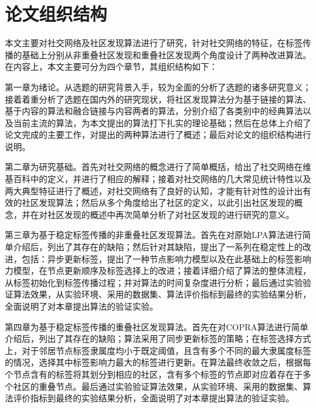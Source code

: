 \section{论文组织结构}

本文主要对社交网络及社区发现算法进行了研究，针对社交网络的特征，在标签传播的基础上分别从非重叠社区发现和重叠社区发现两个角度设计了两种改进算法。在内容上，本文主要可分为四个章节，其组织结构如下：

第一章为绪论。从选题的研究背景入手，较为全面的分析了选题的诸多研究意义；接着着重分析了选题在国内外的研究现状，将社区发现算法分为基于链接的算法、基于内容的算法和融合链接与内容两者的算法，分别介绍了各类别中的经典算法以及当前主流的算法，为本文提出的算法打下扎实的理论基础；然后在总体上介绍了论文完成的主要工作，对提出的两种算法进行了概述；最后对论文的组织结构进行说明。

第二章为研究基础。首先对社交网络的概念进行了简单概括，给出了社交网络在维基百科中的定义，并进行了相应的解释；接着对社交网络的几大常见统计特性以及两大典型特征进行了概述，对社交网络有了良好的认知，才能有针对性的设计出有效的社区发现算法；然后从多个角度给出了社区的定义，以此引出社区发现的概念，并在对社区发现的概述中再次简单分析了对社区发现的进行研究的意义。

第三章为基于稳定标签传播的非重叠社区发现算法。首先在对原始LPA算法进行简单介绍后，列出了其存在的缺陷；然后针对其缺陷，提出了一系列在稳定性上的改进，包括：异步更新标签，提出了一种节点影响力模型以及在此基础上的标签影响力模型，在节点更新顺序及标签选择上的改进；接着详细介绍了算法的整体流程，从标签初始化到标签传播过程；并对算法的时间复杂度进行分析；最后通过实验验证算法效果，从实验环境、采用的数据集、算法评价指标到最终的实验结果分析，全面说明了对本章提出算法的验证实验。

第四章为基于稳定标签传播的重叠社区发现算法。首先在对COPRA算法进行简单介绍后，列出了其存在的缺陷；算法采用了同步更新标签的策略；在标签选择方式上，对于邻居节点标签隶属度均小于既定阈值，且含有多个不同的最大隶属度标签的情况，选择其中标签影响力最大的标签进行更新。在算法最终收敛之后，根据每个节点含有的标签将其划分到相应的社区，含有多个标签的节点即对应着存在于多个社区的重叠节点。最后通过实验验证算法效果，从实验环境、采用的数据集、算法评价指标到最终的实验结果分析，全面说明了对本章提出算法的验证实验。